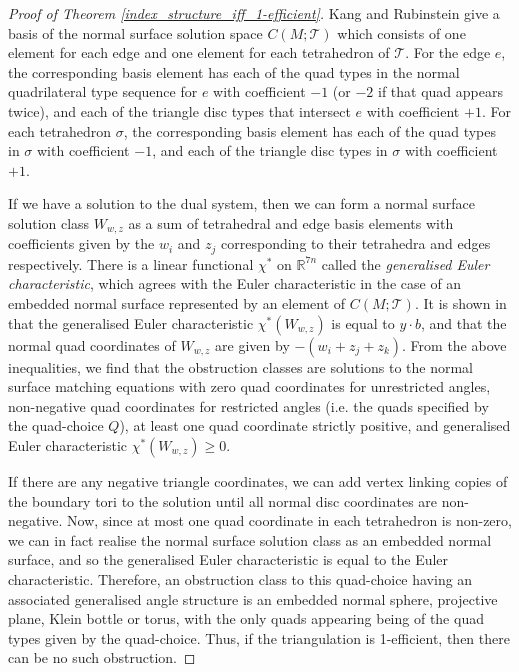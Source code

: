 \documentclass[12pt]{amsart}
\theoremstyle{definition}
\theoremstyle{remark}
\def\tri{\mathcal{T}}
\newcommand{\CT}{\mathcal{T}}
\begin{document}
\begin{proof}[Proof of Theorem \ref{index_structure_iff_1-efficient}]
Kang and Rubinstein \cite{KR1} give a basis of the normal surface solution space  $C(M; \tri)$ which consists of one element for each edge and one element for each tetrahedron of $\CT$. For the edge $e$, the corresponding basis element has each of the quad types in the normal quadrilateral type sequence for $e$ with coefficient $-1$ (or $-2$ if that quad appears twice), and each of the triangle disc types that intersect $e$ with coefficient $+1$. For each tetrahedron $\sigma$, the corresponding basis element has each of the quad types in $\sigma$ with coefficient $-1$, and each of the triangle disc types in $\sigma$ with coefficient $+1$.

If we have a solution to the dual system, then we can form a normal surface solution class $W_{w,z}$ as a sum of tetrahedral and edge basis elements with coefficients given by the $w_i$ and $z_j$ corresponding to their tetrahedra and edges respectively. There is a linear functional $\chi^*$ on $\mathbb{R}^{7n}$ called the \emph{generalised Euler characteristic}, which agrees with the Euler characteristic in the case of an embedded normal surface represented by an element of $C(M; \tri)$. It is shown in \cite{LT} that the generalised Euler characteristic  $\chi^*(W_{w,z})$ is equal to $y\cdot b$, and that the normal quad coordinates of $W_{w,z}$ are given by $-(w_i + z_j + z_k)$. From the above inequalities, we find that the obstruction classes are solutions to the normal surface matching equations with zero quad coordinates for unrestricted angles, non-negative quad coordinates for restricted angles (i.e. the quads specified by the quad-choice $Q$), at least one quad coordinate strictly positive, and generalised Euler characteristic $\chi^*(W_{w,z}) \geq 0$. 

If there are any negative triangle coordinates, we can add vertex linking copies of the boundary tori to the solution until all normal disc coordinates are non-negative. Now, since at most one quad coordinate in each tetrahedron is non-zero, we can in fact realise the normal surface solution class as an embedded normal surface, and so the generalised Euler characteristic is equal to the Euler characteristic. Therefore, an obstruction class to this quad-choice having an associated generalised angle structure is an embedded normal sphere, projective plane, Klein bottle or torus, with the only quads appearing being of the quad types given by the quad-choice. Thus, if the triangulation is 1-efficient, then there can be no such obstruction.


\end{proof}
\end{document}
